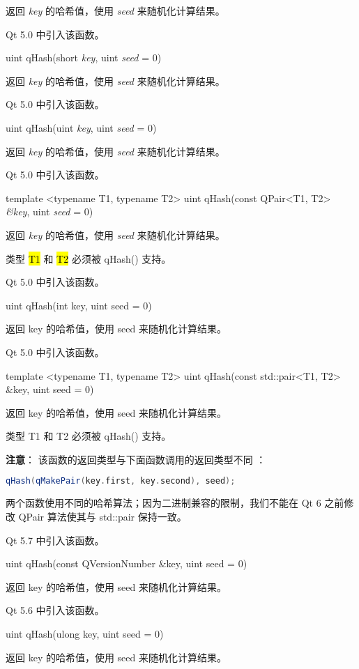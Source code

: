 返回 \emph{key} 的哈希值，使用 \emph{seed} 来随机化计算结果。

Qt 5.0 中引入该函数。

uint qHash(short \emph{key}, uint \emph{seed} = 0)

返回 \emph{key} 的哈希值，使用 \emph{seed} 来随机化计算结果。

Qt 5.0 中引入该函数。

uint qHash(uint \emph{key}, uint \emph{seed} = 0)

返回 \emph{key} 的哈希值，使用 \emph{seed} 来随机化计算结果。

Qt 5.0 中引入该函数。

template <typename T1, typename T2> uint qHash(const QPair<T1, T2> \emph{\&key}, uint \emph{seed} = 0)

返回 \emph{key} 的哈希值，使用 \emph{seed }来随机化计算结果。

类型 \hl{T1} 和 \hl{T2} 必须被 qHash() 支持。

Qt 5.0 中引入该函数。

uint qHash(int key, uint seed = 0)

返回 key 的哈希值，使用 seed 来随机化计算结果。

Qt 5.0 中引入该函数。

template <typename T1, typename T2> uint qHash(const std::pair<T1, T2> \&key, uint seed = 0)

返回 key 的哈希值，使用 seed 来随机化计算结果。

类型 T1 和 T2 必须被 qHash() 支持。

\textbf{注意}： 该函数的返回类型与下面函数调用的返回类型不同 ：


\begin{lstlisting}[language=C++]
qHash(qMakePair(key.first, key.second), seed);
\end{lstlisting}

两个函数使用不同的哈希算法；因为二进制兼容的限制，我们不能在 Qt 6 之前修改 QPair 算法使其与 std::pair 保持一致。

Qt 5.7 中引入该函数。

uint qHash(const QVersionNumber \&key, uint seed = 0)

返回 key 的哈希值，使用 seed 来随机化计算结果。

Qt 5.6 中引入该函数。

uint qHash(ulong key, uint seed = 0)

返回 key 的哈希值，使用 seed 来随机化计算结果。

